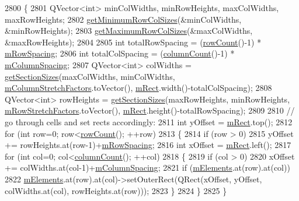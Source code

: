 \begin{DoxyCode}
2800 \{
2801   QVector<int> minColWidths, minRowHeights, maxColWidths, maxRowHeights;
2802   \hyperlink{class_q_c_p_layout_grid_ac645fb9b1c4257b08a9f09dee10b9b3f}{getMinimumRowColSizes}(&minColWidths, &minRowHeights);
2803   \hyperlink{class_q_c_p_layout_grid_af348d903e3b8bc416f1fe1b8125d1173}{getMaximumRowColSizes}(&maxColWidths, &maxRowHeights);
2804   
2805   \textcolor{keywordtype}{int} totalRowSpacing = (\hyperlink{class_q_c_p_layout_grid_af8e6c7a05864ebe610c87756c7b9079c}{rowCount}()-1) * \hyperlink{class_q_c_p_layout_grid_a8b67f183f4645739cc4c794d75843b40}{mRowSpacing};
2806   \textcolor{keywordtype}{int} totalColSpacing = (\hyperlink{class_q_c_p_layout_grid_ac39074eafd148b82d0762090f258189e}{columnCount}()-1) * \hyperlink{class_q_c_p_layout_grid_ae9ac48f0791be07ead0a96dbd5622770}{mColumnSpacing};
2807   QVector<int> colWidths = \hyperlink{class_q_c_p_layout_a92d9dcd95e9510b323706ef7fc4ff62e}{getSectionSizes}(maxColWidths, minColWidths, 
      \hyperlink{class_q_c_p_layout_grid_ac6aabe62339f94f18b9f8adab94b1840}{mColumnStretchFactors}.toVector(), \hyperlink{class_q_c_p_layout_element_ad8896f05550389f7b9e92c9e6cdf6e01}{mRect}.width()-totalColSpacing);
2808   QVector<int> rowHeights = \hyperlink{class_q_c_p_layout_a92d9dcd95e9510b323706ef7fc4ff62e}{getSectionSizes}(maxRowHeights, minRowHeights, 
      \hyperlink{class_q_c_p_layout_grid_a36c85a7eaf342680fb9b8a4977486f16}{mRowStretchFactors}.toVector(), \hyperlink{class_q_c_p_layout_element_ad8896f05550389f7b9e92c9e6cdf6e01}{mRect}.height()-totalRowSpacing);
2809   
2810   \textcolor{comment}{// go through cells and set rects accordingly:}
2811   \textcolor{keywordtype}{int} yOffset = \hyperlink{class_q_c_p_layout_element_ad8896f05550389f7b9e92c9e6cdf6e01}{mRect}.top();
2812   \textcolor{keywordflow}{for} (\textcolor{keywordtype}{int} row=0; row<\hyperlink{class_q_c_p_layout_grid_af8e6c7a05864ebe610c87756c7b9079c}{rowCount}(); ++row)
2813   \{
2814     \textcolor{keywordflow}{if} (row > 0)
2815       yOffset += rowHeights.at(row-1)+\hyperlink{class_q_c_p_layout_grid_a8b67f183f4645739cc4c794d75843b40}{mRowSpacing};
2816     \textcolor{keywordtype}{int} xOffset = \hyperlink{class_q_c_p_layout_element_ad8896f05550389f7b9e92c9e6cdf6e01}{mRect}.left();
2817     \textcolor{keywordflow}{for} (\textcolor{keywordtype}{int} col=0; col<\hyperlink{class_q_c_p_layout_grid_ac39074eafd148b82d0762090f258189e}{columnCount}(); ++col)
2818     \{
2819       \textcolor{keywordflow}{if} (col > 0)
2820         xOffset += colWidths.at(col-1)+\hyperlink{class_q_c_p_layout_grid_ae9ac48f0791be07ead0a96dbd5622770}{mColumnSpacing};
2821       \textcolor{keywordflow}{if} (\hyperlink{class_q_c_p_layout_grid_a3577d3855bf8ad20ef9079291a49f397}{mElements}.at(row).at(col))
2822         \hyperlink{class_q_c_p_layout_grid_a3577d3855bf8ad20ef9079291a49f397}{mElements}.at(row).at(col)->setOuterRect(QRect(xOffset, yOffset, colWidths.at(col), 
      rowHeights.at(row)));
2823     \}
2824   \}
2825 \}
\end{DoxyCode}


